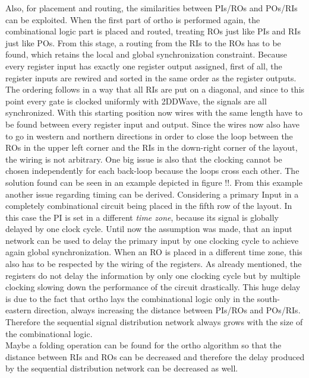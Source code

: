 Also, for placement and routing, the similarities between PIs/ROs and POs/RIs can be exploited. When the first part of ortho is performed again, the combinational logic part is placed and routed, treating ROs just like PIs and RIs just like POs. From this stage, a routing from the RIs to the ROs has to be found, which retains the local and global synchronization constraint. Because every register input has exactly one register output assigned, first of all, the register inputs are rewired and sorted in the same order as the register outputs. The ordering follows in a way that all RIs are put on a diagonal, and since to this point every gate is clocked uniformly with 2DDWave, the signals are all synchronized. With this starting position now wires with the same length have to be found between every register input and output. Since the wires now also have to go in western and northern directions in order to close the loop between the ROs in the upper left corner and the RIs in the down-right corner of the layout, the wiring is not arbitrary. One big issue is also that the clocking cannot be chosen independently for each back-loop because the loops cross each other. The solution found can be seen in an example depicted in figure !!. From this example another issue regarding timing can be derived. Considering a primary Input in a completely combinational circuit being placed in the fifth row of the layout. In this case the PI is set in a different \textit{time zone}, because its signal is globally delayed by one clock cycle. Until now the assumption was made, that an input network can be used to delay the primary input by one clocking cycle to achieve again global synchronization. When an RO is placed in a different time zone, this also has to be respected by the wiring of the registers. As already mentioned, the registers do not delay the information by only one clocking cycle but by multiple clocking slowing down the performance of the circuit drastically. This huge delay is due to the fact that ortho lays the combinational logic only in the south-eastern direction, always increasing the distance between PIs/ROs and POs/RIs. Therefore the sequential signal distribution network always grows with the size of the combinational logic.\\
Maybe a folding operation can be found for the ortho algorithm so that the distance between RIs and ROs can be decreased and therefore the delay produced by the sequential distribution network can be decreased as well.


